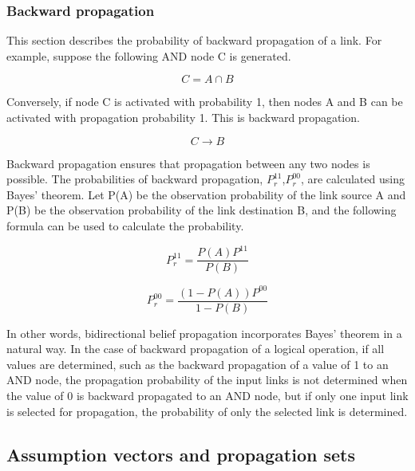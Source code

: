 \documentclass[12pt]{article}
\begin{document}
\subsubsection{Backward propagation}\label{backward-propagation}

This section describes the probability of backward propagation of a
link. For example, suppose the following AND node C is generated.

\[  C=A\cap B \]

Conversely, if node C is activated with probability 1, then nodes A and
B can be activated with propagation probability 1. This is backward
propagation.

\[  C \rightarrow B \]

Backward propagation ensures that propagation between any two nodes is
possible. The probabilities of backward propagation,
\(P_r^{11}\),\(P_r^{00}\), are calculated using Bayes' theorem. Let P(A)
be the observation probability of the link source A and P(B) be the
observation probability of the link destination B, and the following
formula can be used to calculate the probability.

\[ P_{r}^{11}=\frac{P(A) P^{11}}{P(B)}\]

\[ P_{r}^{00}=\frac{(1-P(A)) P^{00}}{1-P(B)}\]

In other words, bidirectional belief propagation incorporates Bayes'
theorem in a natural way. In the case of backward propagation of a
logical operation, if all values \hspace{0pt}\hspace{0pt}are determined,
such as the backward propagation of a value of 1 to an AND node, the
propagation probability of the input links is not determined when the
value of 0 is backward propagated to an AND node, but if only one input
link is selected for propagation, the probability of only the selected
link is determined.

\subsection{Assumption vectors and propagation sets}\label{assumption-vectors-and-propagation-sets}
\end{document}
